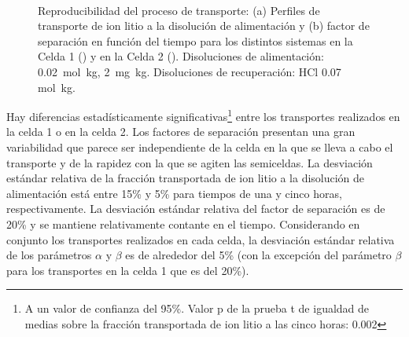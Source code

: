 \begin{figure}[H]
    \centering
    \\
    \caption[Reproducibilidad del proceso de transporte.]{Reproducibilidad del proceso de transporte: (a) Perfiles de transporte de ion litio a la disolución de alimentación  y (b) factor de separación en función del tiempo para los distintos sistemas en la Celda 1 (\protect\triangleupblck) y en la Celda 2 (\protect\triangleupwht). Disoluciones de alimentación:  0.02~mol~kg\mnn,  2~mg~kg\mnn. Disoluciones de recuperación: HCl 0.07 mol~kg\mnn.}
    \label{fig:RPM2}
\end{figure}

Hay diferencias estadísticamente significativas\footnote{A un valor de confianza del 95\%. Valor p de la prueba t de igualdad de medias sobre la fracción transportada de ion litio a las cinco horas: 0.002} entre los transportes realizados en la celda 1 o en la celda 2. Los factores de separación presentan una gran variabilidad que parece ser independiente de la celda en la que se lleva a cabo el transporte y de la rapidez con la que se agiten las semiceldas. La desviación estándar relativa de la fracción transportada de ion litio a la disolución de alimentación está entre 15\% y 5\% para tiempos de una y cinco horas, respectivamente. La desviación estándar relativa del factor de separación es de 20\% y se mantiene relativamente contante en el tiempo. Considerando en conjunto los transportes realizados en cada celda, la desviación estándar relativa de los parámetros $\alpha$ y $\beta$ es de alrededor del 5\% (con la excepción del parámetro $\beta$ para los transportes en la celda 1 que es del 20\%). 

